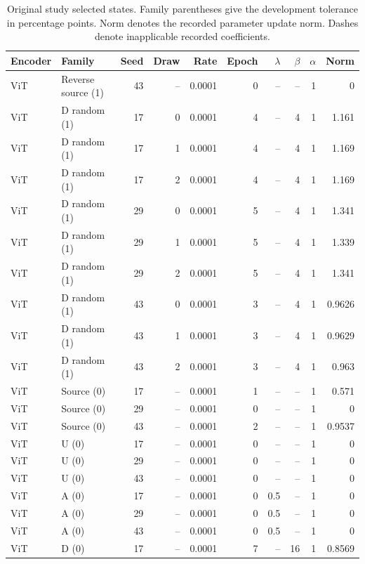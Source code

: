 \begin{table}[t]
\centering
\scriptsize
\setlength{\tabcolsep}{3pt}
\begin{tabular}{llrrrrrrrr}
\toprule
Encoder & Family & Seed & Draw & Rate & Epoch & $\lambda$ & $\beta$ & $\alpha$ & Norm\\
\midrule
ViT & Reverse source (1) & 43 & -- & 0.0001 & 0 & -- & -- & 1 & 0\\
ViT & D random (1) & 17 & 0 & 0.0001 & 4 & -- & 4 & 1 & 1.161\\
ViT & D random (1) & 17 & 1 & 0.0001 & 4 & -- & 4 & 1 & 1.169\\
ViT & D random (1) & 17 & 2 & 0.0001 & 4 & -- & 4 & 1 & 1.169\\
ViT & D random (1) & 29 & 0 & 0.0001 & 5 & -- & 4 & 1 & 1.341\\
ViT & D random (1) & 29 & 1 & 0.0001 & 5 & -- & 4 & 1 & 1.339\\
ViT & D random (1) & 29 & 2 & 0.0001 & 5 & -- & 4 & 1 & 1.341\\
ViT & D random (1) & 43 & 0 & 0.0001 & 3 & -- & 4 & 1 & 0.9626\\
ViT & D random (1) & 43 & 1 & 0.0001 & 3 & -- & 4 & 1 & 0.9629\\
ViT & D random (1) & 43 & 2 & 0.0001 & 3 & -- & 4 & 1 & 0.963\\
ViT & Source (0) & 17 & -- & 0.0001 & 1 & -- & -- & 1 & 0.571\\
ViT & Source (0) & 29 & -- & 0.0001 & 0 & -- & -- & 1 & 0\\
ViT & Source (0) & 43 & -- & 0.0001 & 2 & -- & -- & 1 & 0.9537\\
ViT & U (0) & 17 & -- & 0.0001 & 0 & -- & -- & 1 & 0\\
ViT & U (0) & 29 & -- & 0.0001 & 0 & -- & -- & 1 & 0\\
ViT & U (0) & 43 & -- & 0.0001 & 0 & -- & -- & 1 & 0\\
ViT & A (0) & 17 & -- & 0.0001 & 0 & 0.5 & -- & 1 & 0\\
ViT & A (0) & 29 & -- & 0.0001 & 0 & 0.5 & -- & 1 & 0\\
ViT & A (0) & 43 & -- & 0.0001 & 0 & 0.5 & -- & 1 & 0\\
ViT & D (0) & 17 & -- & 0.0001 & 7 & -- & 16 & 1 & 0.8569\\
\bottomrule
\end{tabular}
\caption{Original study selected states. Family parentheses give the development tolerance in percentage points. Norm denotes the recorded parameter update norm. Dashes denote inapplicable recorded coefficients.}\label{tab:originalselected20}
\end{table}


